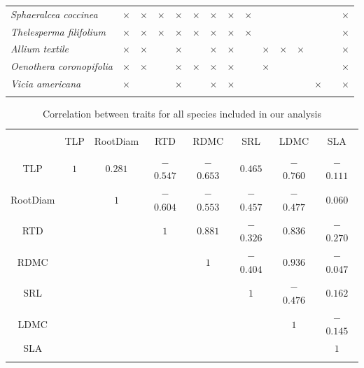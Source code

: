 \documentclass[12pt, letterpaper]{article}
\begin{document}
\begin{table}[h]
{\begin{tabular} {lccccccc|ccccc|cc}
\textit{Sphaeralcea coccinea} & $\times$ & $\times$ & $\times$ & $\times$ & $\times$ & $\times$ & $\times$ & $\times$ &&&&&&$\times$\\ 
\rowcolor[gray]{.95}\textit{Thelesperma filifolium} & $\times$ & $\times$ & $\times$ & $\times$ & $\times$ & $\times$ & $\times$ & $\times$ &&&&&&$\times$\\ 
\textit{Allium textile} & $\times$ & $\times$ & & $\times$ & & $\times$ & $\times$ & & $\times$ &$\times$&$\times$&&&$\times$\\ 
\rowcolor[gray]{.95}\textit{Oenothera coronopifolia} & $\times$ & $\times$ & & $\times$ & $\times$ & $\times$ & $\times$ & &$\times$ &&&&&$\times$\\ 
\textit{Vicia americana} & $\times$ & & & $\times$ & & $\times$ & $\times$ & &&&&$\times$&&$\times$\\
\hline \\[-1.8ex] 
\end{tabular}}
\end{table}

\begin{table}[h] \centering 
 \caption{\internallinenumbersPearson Correlation between traits for all species included in our analysis} 
 \label{allSppCorr}
\begin{tabular} {cccccccc} 
\\[-1.8ex]\hline 
\hline \\[-1.8ex] 
 & TLP & RootDiam & RTD & RDMC & SRL & LDMC & SLA \\ 
\hline \\[-1.8ex] 
\rowcolor[gray]{.95}TLP & $1$ & $0.281$ & $-$ $0.547$ & $-$ $0.653$ & $0.465$ & $-$ $0.760$ & $-$ $0.111$ \\ 
RootDiam & & $1$ & $-$ $0.604$ & $-$ $0.553$ & $-$ $0.457$ & $-$ $0.477$ & $0.060$ \\ 
\rowcolor[gray]{.95}RTD& & & $1$ & $0.881$ & $-$ $0.326$ & $0.836$ & $-$ $0.270$ \\ 
RDMC& & & & $1$ & $-$ $0.404$ & $0.936$ & $-$ $0.047$ \\ 
\rowcolor[gray]{.95}SRL & & & & & $1$ & $-$ $0.476$ & $0.162$ \\ 
LDMC & & & & & & $1$ & $-$ $0.145$ \\ 
\rowcolor[gray]{.95}SLA & & & & & & & $1$ \\ 
\hline \\[-1.8ex] 
\end{tabular} 
\end{table}
\end{document}
